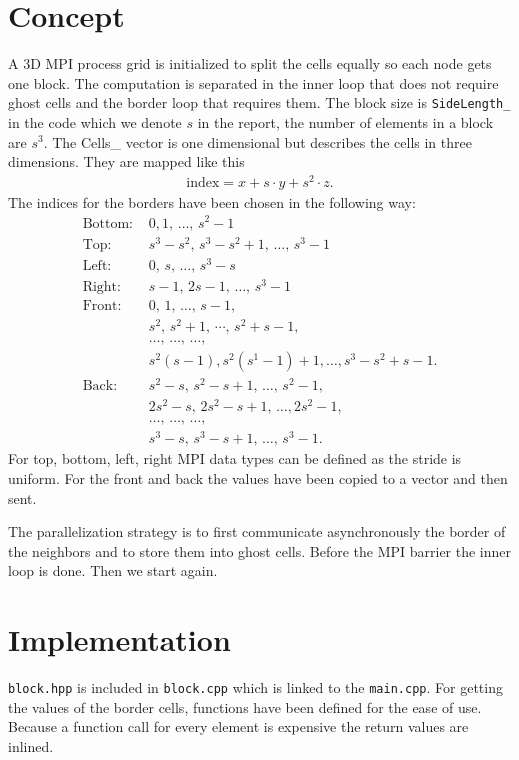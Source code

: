 \section{Concept}
A 3D MPI process grid is initialized to split the cells equally so each node gets one block. The computation is separated in the inner loop that does not require ghost cells and the border loop that requires them. The block size is \texttt{SideLength\_} in the code which we denote $s$ in the report, the number of elements in a block are $s^3$. The Cells\_ vector is one dimensional but describes the cells in three dimensions. They are mapped like this
\begin{gather*}
	\text{index}=x+s\cdot y+s^2\cdot z.
\end{gather*}
The indices for the borders have been chosen in the following way:
\begin{align*}
	\text{Bottom: }& 0,1,\,\ldots,\,s^2-1\\
	\text{Top: }&s^3-s^2,\,s^3-s^2+1,\,\ldots,\,s^3-1\\
	\text{Left: }&0,\,s,\,\ldots,\,s^3-s\\
	\text{Right: }&s-1,\,2s-1,\,\ldots,\,s^3-1\\
	\text{Front: }&0,\,1,\,\ldots,\,s-1,\\
	&s^2,\,s^2+1,\,\cdots,\,s^2+s-1,\\
	&\ldots,\,\ldots,\,\ldots,\\
	&s^2(s-1),s^2(s^1-1)+1,\ldots,s^3-s^2+s-1.\\
	\text{Back: }&s^2-s,\,s^2-s+1,\,\ldots,\,s^2-1,\\
	&2s^2-s,\,2s^2-s+1,\,\ldots,2s^2-1,\\
	&\ldots,\,\ldots,\,\ldots,\\
	&s^3-s,\,s^3-s+1,\,\ldots,\,s^3-1.
\end{align*}
For top, bottom, left, right MPI data types can be defined as the stride is uniform. For the front and back the values have been copied to a vector and then sent. 

The parallelization strategy is to first communicate asynchronously the border of the neighbors and to store them into ghost cells. Before the MPI barrier the inner loop is done. Then we start again.

\section{Implementation}
\texttt{block.hpp}  is included in \texttt{block.cpp} which is linked to the \texttt{main.cpp}. For getting the values of the border cells, functions have been defined for the ease of use. Because a function call for every element is expensive the return values are inlined. 
